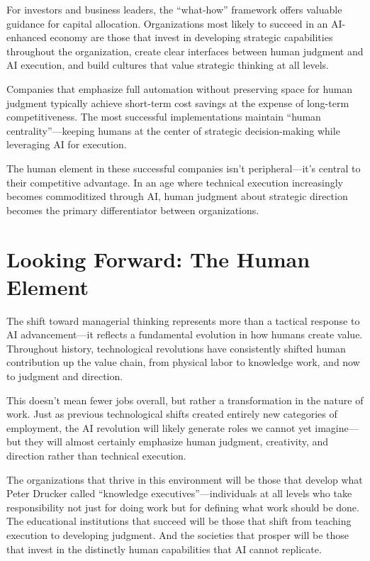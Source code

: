 \documentclass[
  Letterpaper,
]{scrbook}
\begin{document}
For investors and business leaders, the ``what-how'' framework offers
valuable guidance for capital allocation. Organizations most likely to
succeed in an AI-enhanced economy are those that invest in developing
strategic capabilities throughout the organization, create clear
interfaces between human judgment and AI execution, and build cultures
that value strategic thinking at all levels.

Companies that emphasize full automation without preserving space for
human judgment typically achieve short-term cost savings at the expense
of long-term competitiveness. The most successful implementations
maintain ``human centrality''---keeping humans at the center of
strategic decision-making while leveraging AI for execution.

The human element in these successful companies isn't peripheral---it's
central to their competitive advantage. In an age where technical
execution increasingly becomes commoditized through AI, human judgment
about strategic direction becomes the primary differentiator between
organizations.

\section{Looking Forward: The Human
Element}\label{looking-forward-the-human-element}

The shift toward managerial thinking represents more than a tactical
response to AI advancement---it reflects a fundamental evolution in how
humans create value. Throughout history, technological revolutions have
consistently shifted human contribution up the value chain, from
physical labor to knowledge work, and now to judgment and direction.

This doesn't mean fewer jobs overall, but rather a transformation in the
nature of work. Just as previous technological shifts created entirely
new categories of employment, the AI revolution will likely generate
roles we cannot yet imagine---but they will almost certainly emphasize
human judgment, creativity, and direction rather than technical
execution.

The organizations that thrive in this environment will be those that
develop what Peter Drucker called ``knowledge executives''---individuals
at all levels who take responsibility not just for doing work but for
defining what work should be done. The educational institutions that
succeed will be those that shift from teaching execution to developing
judgment. And the societies that prosper will be those that invest in
the distinctly human capabilities that AI cannot replicate.
\end{document}
